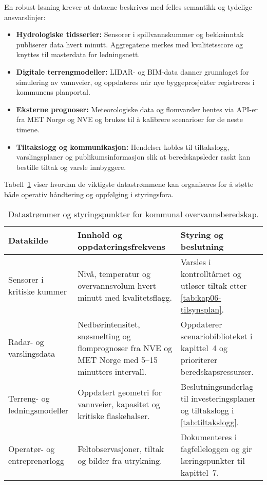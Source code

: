 En robust løsning krever at dataene beskrives med felles semantikk og tydelige ansvarslinjer:
\begin{itemize}
    \item \textbf{Hydrologiske tidsserier:} Sensorer i spillvannskummer og bekkeinntak publiserer data hvert minutt. Aggregatene merkes med kvalitetsscore og knyttes til masterdata for ledningsnett.
    \item \textbf{Digitale terrengmodeller:} LIDAR- og BIM-data danner grunnlaget for simulering av vannveier, og oppdateres når nye byggeprosjekter registreres i kommunens planportal.
    \item \textbf{Eksterne prognoser:} Meteorologiske data og flomvarsler hentes via API-er fra MET Norge og NVE og brukes til å kalibrere scenarioer for de neste timene.
    \item \textbf{Tiltakslogg og kommunikasjon:} Hendelser kobles til tiltakslogg, varslingsplaner og publikumsinformasjon slik at beredskapsleder raskt kan bestille tiltak og varsle innbyggere.
\end{itemize}

Tabell~\ref{tab:kap03-overvann} viser hvordan de viktigste datastrømmene kan organiseres for å støtte både operativ håndtering og oppfølging i styringsfora.

\begin{table}[ht]
    \centering
    \caption{Datastrømmer og styringspunkter for kommunal overvannsberedskap.}
    \label{tab:kap03-overvann}
    \begin{tabular}{p{3.6cm}p{4.6cm}p{3.6cm}}
        \toprule
        \textbf{Datakilde} & \textbf{Innhold og oppdateringsfrekvens} & \textbf{Styring og beslutning} \\
        \midrule
        Sensorer i kritiske kummer & Nivå, temperatur og overvannsvolum hvert minutt med kvalitetsflagg. & Varsles i kontrolltårnet og utløser tiltak etter \autoref{tab:kap06-tilsynsplan}. \\
        Radar- og varslingsdata & Nedbørintensitet, snøsmelting og flomprognoser fra NVE og MET Norge med 5--15 minutters intervall. & Oppdaterer scenariobiblioteket i kapittel~4 og prioriterer beredskapsressurser. \\
        Terreng- og ledningsmodeller & Oppdatert geometri for vannveier, kapasitet og kritiske flaskehalser. & Beslutningsunderlag til investeringsplaner og tiltakslogg i \autoref{tab:tiltakslogg}. \\
        Operatør- og entreprenørlogg & Feltobservasjoner, tiltak og bilder fra utrykning. & Dokumenteres i fagfelleloggen og gir læringspunkter til kapittel~7. \\
        \bottomrule
    \end{tabular}
\end{table}


